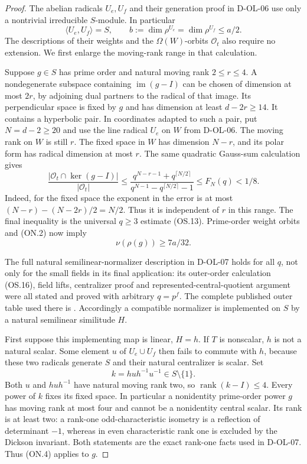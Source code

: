 \begin{proof}
The abelian radicals $U_e,U_f$ and their generation proof in
D-OL-06 use only a nontrivial irreducible $S$-module.  In particular
\[
       \langle U_e,U_f\rangle=S,\qquad
       b:=\dim\rho^{U_e}=\dim\rho^{U_f}\le a/2.             \tag{ON.2}
\]
The descriptions of their weights and the $\Omega(W)$-orbits
$\mathcal O_t$ also require no extension.  We first enlarge the
moving-rank range in that calculation.

Suppose $g\in S$ has prime order and natural moving rank
$2\le r\le4$.  A nondegenerate subspace containing
$\operatorname{im}(g-I)$ can be chosen of dimension at most $2r$,
by adjoining dual partners to the radical of that image.  Its
perpendicular space is fixed by $g$ and has dimension at least
$d-2r\ge14$.  It contains a hyperbolic pair.  In coordinates
adapted to such a pair, put $N=d-2\ge20$ and use the line radical
$U_e$ on $W$ from D-OL-06.  The moving rank on $W$ is still $r$.
The fixed space in $W$ has dimension $N-r$, and its polar form
has radical dimension at most $r$.  The same quadratic Gauss-sum
calculation gives
\[
 \frac{|\mathcal O_t\cap\ker(g-I)|}{|\mathcal O_t|}
 \le
 \frac{q^{N-r-1}+q^{\lceil N/2\rceil}}
      {q^{N-1}-q^{\lceil N/2\rceil}-1}
 \le F_N(q)<1/8.                                           \tag{ON.3}
\]
Indeed, for the fixed space the exponent in the error is at most
$(N-r)-(N-2r)/2=N/2$.  Thus it is independent of $r$ in this
range.  The final inequality is the universal $q\ge3$ estimate
(OS.13).  Prime-order weight orbits and (ON.2) now imply
\[
                         \nu(\rho(g))\ge7a/32.              \tag{ON.4}
\]

The full natural semilinear-normalizer description in D-OL-07
holds for all $q$, not only for the small fields in its final
application: its outer-order calculation (OS.16), field lifts,
centralizer proof and represented-central-quotient argument were
all stated and proved with arbitrary $q=p^f$.  The complete
published outer table used there is
\cite[Section~2.2.2, Table~2.1, p.~14]{HES:LiXia2022}.
Accordingly a compatible normalizer is implemented on $S$ by a
natural semilinear similitude $H$.

First suppose this implementing map is linear, $H=h$.
If $T$ is nonscalar, $h$ is not a natural scalar.  Some element
$u$ of $U_e\cup U_f$ then fails to commute with $h$, because these
two radicals generate $S$ and their natural centralizer is scalar.
Set
\[
             k=huh^{-1}u^{-1}\in S\setminus\{1\}.          \tag{ON.5}
\]
Both $u$ and $huh^{-1}$ have natural moving rank two, so
$\operatorname{rank}(k-I)\le4$.  Every power of $k$ fixes its
fixed space.  In particular a nonidentity prime-order power $g$
has moving rank at most four and cannot be a nonidentity central
scalar.  Its rank is at least two: a rank-one odd-characteristic
isometry is a reflection of determinant $-1$, whereas in even
characteristic rank one is excluded by the Dickson invariant.
Both statements are the exact rank-one facts used in D-OL-07.
Thus (ON.4) applies to $g$.


\end{proof}
